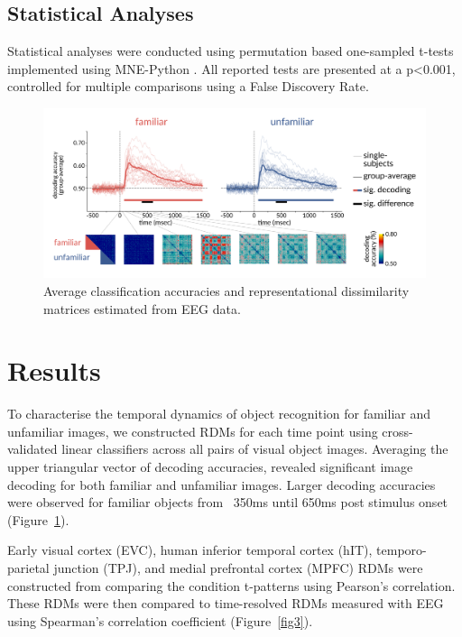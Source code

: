 \documentclass[10pt,letterpaper]{article}
\begin{document}
\subsection{Statistical Analyses}

Statistical analyses were conducted using permutation based one-sampled t-tests
implemented using MNE-Python \cite{Gramfort2013-tl}. All reported tests are
presented at a p\textless0.001, controlled for multiple comparisons using a False
Discovery Rate.

\begin{figure}[ht]
  \begin{center}
  \includegraphics[width=\linewidth]{figures/figure2_smaller.png}
  \end{center}
  \caption{
    Average classification accuracies and representational dissimilarity
    matrices estimated from EEG data.
  } 
  \label{fig2}
  \end{figure}

\section{Results}

To characterise the temporal dynamics of object recognition for familiar and
unfamiliar images, we constructed RDMs for each time point using cross-validated
linear classifiers across all pairs of visual object images. Averaging the upper
triangular vector of decoding accuracies, revealed significant image decoding
for both familiar and unfamiliar images. Larger decoding accuracies were
observed for familiar objects from ~350ms until 650ms post stimulus onset
(Figure~\ref{fig2}). 

Early visual cortex (EVC), human inferior temporal cortex (hIT),
temporo-parietal junction (TPJ), and medial prefrontal cortex (MPFC) RDMs were
constructed from comparing the condition t-patterns using Pearson’s correlation.
These RDMs were then compared to time-resolved RDMs measured with EEG using
Spearman’s correlation coefficient (Figure~\ref{fig3}). 
\end{document}
